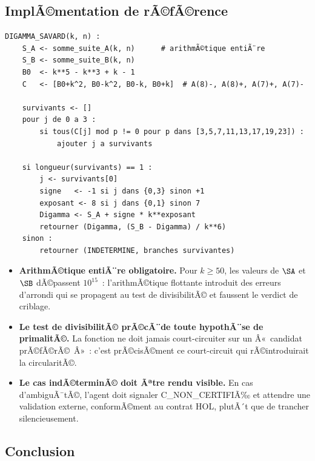 \subsection{ImplÃ©mentation de rÃ©fÃ©rence}

\begin{boitenote}
\begin{Verbatim}[frame=single,fontsize=\footnotesize]
DIGAMMA_SAVARD(k, n) :
    S_A <- somme_suite_A(k, n)      # arithmÃ©tique entiÃ¨re
    S_B <- somme_suite_B(k, n)
    B0  <- k**5 - k**3 + k - 1
    C   <- [B0+k^2, B0-k^2, B0-k, B0+k]  # A(8)-, A(8)+, A(7)+, A(7)-

    survivants <- []
    pour j de 0 a 3 :
        si tous(C[j] mod p != 0 pour p dans [3,5,7,11,13,17,19,23]) :
            ajouter j a survivants

    si longueur(survivants) == 1 :
        j <- survivants[0]
        signe   <- -1 si j dans {0,3} sinon +1
        exposant <- 8 si j dans {0,1} sinon 7
        Digamma <- S_A + signe * k**exposant
        retourner (Digamma, (S_B - Digamma) / k**6)
    sinon :
        retourner (INDETERMINE, branches survivantes)
\end{Verbatim}
\end{boitenote}

\begin{boitenote}
\begin{itemize}[nosep]
  \item \textbf{ArithmÃ©tique entiÃ¨re obligatoire.} Pour $k \ge 50$, les
    valeurs de $\SA$ et $\SB$ dÃ©passent $10^{15}$~: l'arithmÃ©tique
    flottante introduit des erreurs d'arrondi qui se propagent au
    test de divisibilitÃ© et faussent le verdict de criblage.
  \item \textbf{Le test de divisibilitÃ© prÃ©cÃ¨de toute hypothÃ¨se de
    primalitÃ©.} La fonction ne doit jamais court-circuiter sur un
    Â«~candidat prÃ©fÃ©rÃ©~Â»~: c'est prÃ©cisÃ©ment ce court-circuit qui
    rÃ©introduirait la circularitÃ©.
  \item \textbf{Le cas indÃ©terminÃ© doit Ãªtre rendu visible.} En cas
    d'ambiguÃ¯tÃ©, l'agent doit signaler \textsc{C\_NON\_CERTIFIÃ‰} et
    attendre une validation externe, conformÃ©ment au contrat HOL,
    plutÃ´t que de trancher silencieusement.
\end{itemize}
\end{boitenote}


\subsection{Conclusion}

